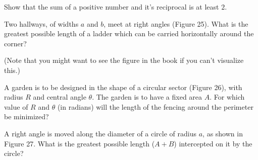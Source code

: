 \documentclass[12pt,letterpaper]{hmcpset}
\begin{document}

\begin{problem}[11.13]

    Show that the sum of a positive number and it's reciprocal is at least $2$.

\end{problem}

\begin{solution}

\end{solution}
\newpage

\begin{problem}[11.15]

    Two hallways, of widths $a$ and $b$, meet at right angles (Figure 25). What is the greatest possible length of a ladder which can be carried horizontally around the corner?

    (Note that you might want to see the figure in the book if you can't visualize this.)

\end{problem}

\begin{solution}

\end{solution}
\newpage

\begin{problem}[11.16]

    A garden is to be designed in the shape of a circular sector (Figure 26), with radius $R$ and central angle $\theta$. The garden is to have a fixed area $A$. For which value of $R$ and $\theta$ (in radians) will the length of the fencing around the perimeter be minimized?

\end{problem}

\begin{solution}

\end{solution}
\newpage

\begin{problem}[11.17]

    A right angle is moved along the diameter of a circle of radius $a$, as shown in Figure 27. What is the greatest possible length ($A+B$) intercepted on it by the circle?

\end{problem}

\begin{solution}

\end{solution}
\newpage
\end{document}
